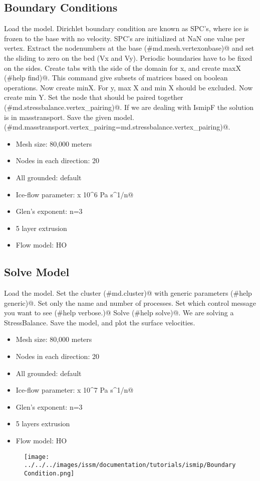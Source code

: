 \subsection{Boundary Conditions} %
Load the \verb@SetFlow@ model. Dirichlet boundary condition are known as SPC's, where ice is frozen to the base with no velocity. SPC's are initialized at NaN one value per vertex. Extract the nodenumbers at the base \verb@(#md.mesh.vertexonbase)@ and set the sliding to zero on the bed (Vx and Vy). Periodic boundaries have to be fixed on the sides. Create tabs with the side of the domain for x, and create maxX \verb@(#help find)@. This command give subsets of matrices based on boolean operations. Now create minX. For y, max X and min X should be excluded. Now create min Y. Set the node that should be paired together \verb@(#md.stressbalance.vertex_pairing)@. If we are dealing with IsmipF the solution is in masstransport. Save the given model. \verb@(#md.masstransport.vertex_pairing=md.stressbalance.vertex_pairing)@.
\begin{itemize}
	\item Mesh size: 80,000 meters
	\item Nodes in each direction: 20
	\item All grounded: default
	\item Ice-flow parameter:  x 10^6 Pa s^1/n@
	\item Glen's exponent: n=3
	\item 5 layer extrusion
	\item Flow model: HO
\end{itemize}
\subsection{Solve Model} %
Load the \verb@BoundaryConditions@ model. Set the cluster \verb@(#md.cluster)@ with generic parameters \verb@(#help generic)@. Set only the name and number of processes. Set which control message you want to see \verb@(#help verbose.)@ Solve \verb@(#help solve)@. We are solving a StressBalance. Save the model, and plot the surface velocities.
\begin{itemize}
	\item Mesh size: 80,000 meters
	\item Nodes in each direction: 20
	\item All grounded: default
	\item Ice-flow parameter:  x 10^7 Pa s^1/n@
	\item Glen's exponent: n=3
	\item 5 layers extrusion
	\item Flow model: HO
\end{itemize}
\begin{figure}[H]
	\begin{center}
		\texttt{[image: ../../../images/issm/documentation/tutorials/ismip/BoundaryCondition.png]}
	\end{center}
\end{figure}
